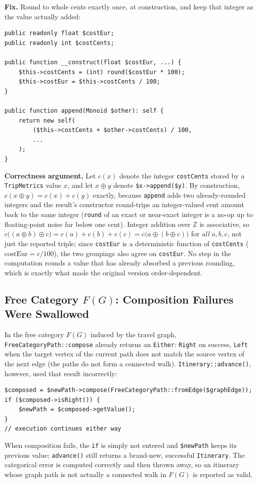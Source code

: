 \documentclass[a4paper,12pt,fleqn]{article}
\begin{document}
\textbf{Fix.} Round to whole cents exactly once, at construction, and keep that integer as the value actually added:
\begin{lstlisting}[caption={Fixed \texttt{TripMetrics} -- integer cents as the additive carrier}]
public readonly float $costEur;
public readonly int $costCents;

public function __construct(float $costEur, ...) {
    $this->costCents = (int) round($costEur * 100);
    $this->costEur = $this->costCents / 100;
}

public function append(Monoid $other): self {
    return new self(
        ($this->costCents + $other->costCents) / 100,
        ...
    );
}
\end{lstlisting}

\textbf{Correctness argument.} Let $c(x)$ denote the integer \texttt{costCents} stored by a \texttt{TripMetrics} value $x$, and let $x \oplus y$ denote \texttt{\$x->append(\$y)}. By construction, $c(x\oplus y) = c(x) + c(y)$ exactly, because \texttt{append} adds two already-rounded integers and the result's constructor round-trips an integer-valued cent amount back to the same integer (\texttt{round} of an exact or near-exact integer is a no-op up to floating-point noise far below one cent). Integer addition over $\mathbb{Z}$ is associative, so $c\big((a\oplus b)\oplus c\big) = c(a)+c(b)+c(c) = c\big(a\oplus(b\oplus c)\big)$ for \emph{all} $a,b,c$, not just the reported triple; since \texttt{costEur} is a deterministic function of \texttt{costCents} ($\mathrm{costEur}=c/100$), the two groupings also agree on \texttt{costEur}. No step in the computation rounds a value that has already absorbed a previous rounding, which is exactly what made the original version order-dependent.

\subsection{Free Category $F(G)$: Composition Failures Were Swallowed}\label{sec:bug3}

In the free category $F(G)$ induced by the travel graph, \texttt{FreeCategoryPath::compose} already returns an \texttt{Either}: \texttt{Right} on success, \texttt{Left} when the target vertex of the current path does not match the source vertex of the next edge (the paths do not form a connected walk). \texttt{Itinerary::advance()}, however, used that result incorrectly:
\begin{lstlisting}[caption={Original \texttt{Itinerary::advance} -- Left is discarded}]
$composed = $newPath->compose(FreeCategoryPath::fromEdge($graphEdge));
if ($composed->isRight()) {
    $newPath = $composed->getValue();
}
// execution continues either way
\end{lstlisting}
When composition fails, the \texttt{if} is simply not entered and \texttt{\$newPath} keeps its previous value; \texttt{advance()} still returns a brand-new, successful \texttt{Itinerary}. The categorical error is computed correctly and then thrown away, so an itinerary whose graph path is not actually a connected walk in $F(G)$ is reported as valid.
\end{document}
